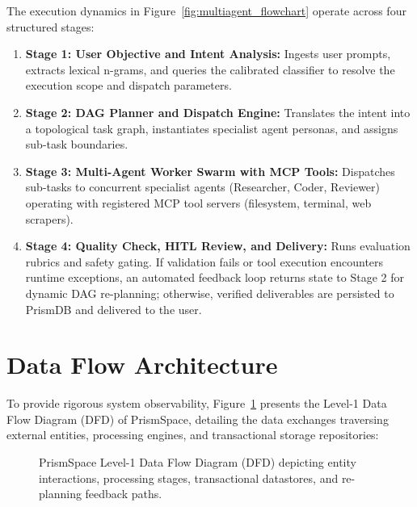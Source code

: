 \documentclass[12pt,a4paper]{report}
\begin{document}
The execution dynamics in Figure~\ref{fig:multiagent_flowchart} operate across four structured stages:
\begin{enumerate}
    \item \textbf{Stage 1: User Objective and Intent Analysis:} Ingests user prompts, extracts lexical n-grams, and queries the calibrated classifier to resolve the execution scope and dispatch parameters.
    \item \textbf{Stage 2: DAG Planner and Dispatch Engine:} Translates the intent into a topological task graph, instantiates specialist agent personas, and assigns sub-task boundaries.
    \item \textbf{Stage 3: Multi-Agent Worker Swarm with MCP Tools:} Dispatches sub-tasks to concurrent specialist agents (Researcher, Coder, Reviewer) operating with registered MCP tool servers (filesystem, terminal, web scrapers).
    \item \textbf{Stage 4: Quality Check, HITL Review, and Delivery:} Runs evaluation rubrics and safety gating. If validation fails or tool execution encounters runtime exceptions, an automated feedback loop returns state to Stage 2 for dynamic DAG re-planning; otherwise, verified deliverables are persisted to PrismDB and delivered to the user.
\end{enumerate}

\section{Data Flow Architecture}
To provide rigorous system observability, Figure~\ref{fig:data_flow_diagram} presents the Level-1 Data Flow Diagram (DFD) of PrismSpace, detailing the data exchanges traversing external entities, processing engines, and transactional storage repositories:

\begin{figure}[H]
    \centering
    \caption{PrismSpace Level-1 Data Flow Diagram (DFD) depicting entity interactions, processing stages, transactional datastores, and re-planning feedback paths.}
    \label{fig:data_flow_diagram}
\end{figure}
\end{document}
